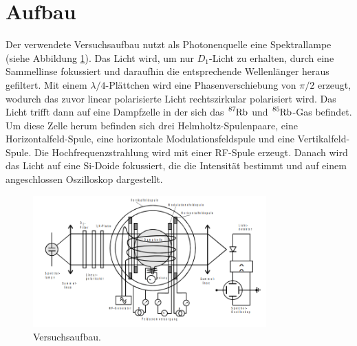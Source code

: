 
\section{Aufbau}
\label{sec:Versuchaufbau}

Der verwendete Versuchsaufbau nutzt als Photonenquelle eine Spektrallampe (siehe Abbildung \ref{fig:Versuchsaufbau}).
Das Licht wird, um nur $D_1$-Licht zu erhalten, durch eine Sammellinse fokussiert und daraufhin die entsprechende Wellenlänger heraus gefiltert.
Mit einem $\lambda /4$-Plättchen wird eine Phasenverschiebung von $\pi /2$ erzeugt, wodurch das zuvor linear polarisierte Licht rechtszirkular polarisiert wird.
Das Licht trifft dann auf eine Dampfzelle in der sich das $\ce{^{87}_{}Rb}$ und $\ce{^{85}_{}Rb}$-Gas befindet.
Um diese Zelle herum befinden sich drei Helmholtz-Spulenpaare, eine Horizontalfeld-Spule, eine horizontale Modulationsfeldspule und eine Vertikalfeld-Spule.
Die Hochfrequenzstrahlung wird mit einer RF-Spule erzeugt.
Danach wird das Licht auf eine Si-Doide fokussiert, die die Intensität bestimmt und auf einem angeschlossen  Oszilloskop dargestellt.

\begin{figure}
 \centering
 \includegraphics[width=0.8\textwidth]{img/Aufbau.png}
 \caption{Versuchsaufbau. \cite{skript}}
 \label{fig:Versuchsaufbau}
\end{figure}
